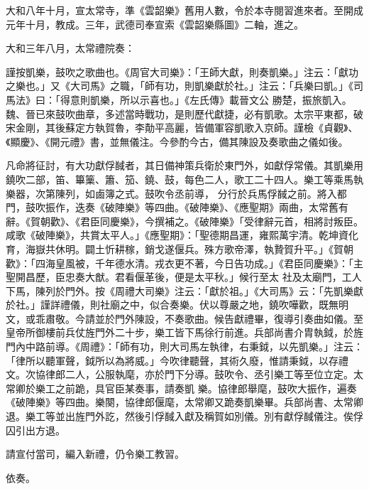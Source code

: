 \begin{pinyinscope}
 大和八年十月，宣太常寺，準《雲韶樂》舊用人數，令於本寺閱習進來者。至開成元年十月，教成。三年，武德司奉宣索《雲韶樂縣圖》二軸，進之。



 大和三年八月，太常禮院奏：



 謹按凱樂，鼓吹之歌曲也。《周官大司樂》：「王師大獻，則奏凱樂。」注云：「獻功之樂也。」又《大司馬》之職，「師有功，則凱樂獻於社。」注云：「兵樂曰凱。」《司馬法》曰：「得意則凱樂，所以示喜也。」《左氏傳》載晉文公
 勝楚，振旅凱入。魏、晉已來鼓吹曲章，多述當時戰功，是則歷代獻捷，必有凱歌。太宗平東都，破宋金剛，其後蘇定方執賀魯，李勣平高麗，皆備軍容凱歌入京師。謹檢《貞觀》、《顯慶》、《開元禮》書，並無儀注。今參酌今古，備其陳設及奏歌曲之儀如後。



 凡命將征討，有大功獻俘馘者，其日備神策兵衛於東門外，如獻俘常儀。其凱樂用鐃吹二部，笛、篳篥、簫、笳、鐃、鼓，每色二人，歌工二十四人。樂工等乘馬執樂器，次第陳列，如鹵簿之式。鼓吹令丞前導，
 分行於兵馬俘馘之前。將入都門，鼓吹振作，迭奏《破陣樂》等四曲。《破陣樂》、《應聖期》兩曲，太常舊有辭。《賀朝歡》、《君臣同慶樂》，今撰補之。《破陣樂》「受律辭元首，相將討叛臣。咸歌《破陣樂》，共賞太平人。」《應聖期》：「聖德期昌運，雍熙萬宇清。乾坤資化育，海嶽共休明。闢土忻耕稼，銷戈遂偃兵。殊方歌帝澤，執贄賀升平。」《賀朝歡》：「四海皇風被，千年德水清。戎衣更不著，今日告功成。」《君臣同慶樂》：「主聖開昌歷，臣忠奏大猷。君看偃革後，便是太平秋。」候行至太
 社及太廟門，工人下馬，陳列於門外。按《周禮大司樂》注云：「獻於祖。」《大司馬》云：「先凱樂獻於社。」謹詳禮儀，則社廟之中，似合奏樂。伏以尊嚴之地，鐃吹嘩歡，既無明文，或乖肅敬。今請並於門外陳設，不奏歌曲。候告獻禮畢，復導引奏曲如儀。至皇帝所御樓前兵仗旌門外二十步，樂工皆下馬徐行前進。兵部尚書介胄執鉞，於旌門內中路前導。《周禮》：「師有功，則大司馬左執律，右秉鉞，以先凱樂。」注云：「律所以聽軍聲，鉞所以為將威。」今吹律聽聲，其術久廢，惟請秉鉞，以存禮文。次協律郎二人，公服執麾，亦於門下分導。鼓吹令、丞引樂工等至位立定。太常卿於樂工之前跪，具官臣某奏事，請奏凱
 樂。協律郎舉麾，鼓吹大振作，遍奏《破陣樂》等四曲。樂闋，協律郎偃麾，太常卿又跪奏凱樂畢。兵部尚書、太常卿退。樂工等並出旌門外訖，然後引俘馘入獻及稱賀如別儀。別有獻俘馘儀注。俟俘囚引出方退。



 請宣付當司，編入新禮，仍令樂工教習。



 依奏。



\end{pinyinscope}